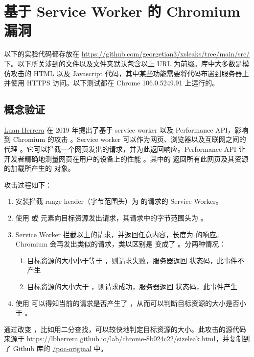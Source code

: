 \section{基于 Service Worker 的 Chromium 漏洞}

以下的实验代码都存放在 \url{https://github.com/georgetian3/xsleaks/tree/main/src/} 下。以下所关涉到的文件以及文件夹默认包含以上 URL 为前缀。库中大多数是模仿攻击的 HTML 以及 Javascript 代码，其中某些功能需要将代码布置到服务器上并使用 HTTPS 访问。以下测试都在 Chrome 106.0.5249.91 上运行的。

\subsection{概念验证}

\href{https://blog.lbherrera.me/}{Luan Herrera} 在 2019 年提出了基于 service worker 以及 Performance API，影响到 Chromium 的攻击 \cite{herrera}。Service worker 可以作为网页、浏览器以及互联网之间的代理 \cite{sw} 。它可以拦截一个网页发出的请求，并为此返回响应。Performance API 让开发者精确地测量网页在用户的设备上的性能 \cite{papi}。其中的  返回所有此网页及其资源的加载所产生的  对象。

攻击过程如下：
\begin{enumerate}
    \item 安装拦截 range header（字节范围头）为  的请求的 Service Worker。
    \item 使用  或  元素向目标资源发出请求，其请求中的字节范围头为 。
    \item Service Worker 拦截以上的请求，并返回任意内容，长度为  的响应。Chromium 会再发出类似的请求，类以区别是  变成了 。分两种情况：
    \begin{enumerate}
        \item 目标资源的大小小于等于 ，则请求失败，服务器返回  状态码，此事件不产生 
        \item 目标资源的大小大于 ，则请求成功，服务器返回  状态码，此事件产生 
    \end{enumerate}
    \item 使用  可以得知当前的请求是否产生了 ，从而可以判断目标资源的大小是否小于 。
\end{enumerate}

通过改变 ，比如用二分查找，可以较快地判定目标资源的大小。此攻击的源代码来源于 \url{https://lbherrera.github.io/lab/chrome-8b024c22/sizeleak.html}，并复制到了 Github 库的 \href{https://github.com/georgetian3/xsleaks/tree/main/src/poc-original}{/poc-original} 中。

